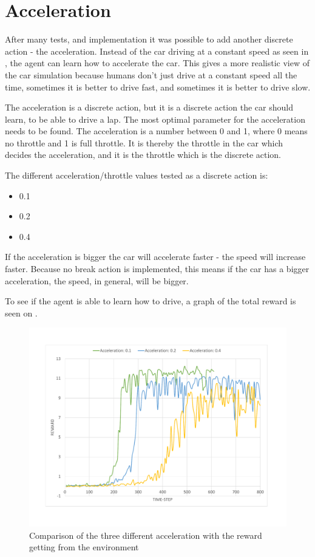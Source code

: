 \section{Acceleration}\label{sectionAcceleration_new}
After many tests, and implementation it was possible to add another discrete action - the acceleration. Instead of the car driving at a constant speed as seen in , the agent can learn how to accelerate the car. This gives a more realistic view of the car simulation because humans don't just drive at a constant speed all the time, sometimes it is better to drive fast, and sometimes it is better to drive slow.  

The acceleration is a discrete action, but it is a discrete action the car should learn, to be able to drive a lap. The most optimal parameter for the acceleration needs to be found. The acceleration is a number between 0 and 1, where 0 means no throttle and 1 is full throttle. It is thereby the throttle in the car which decides the acceleration, and it is the throttle which is the discrete action.

The different acceleration/throttle values tested as a discrete action is:

\begin{itemize}
	\item 0.1
	\item 0.2
	\item 0.4
\end{itemize} 
   
If the acceleration is bigger the car will accelerate faster - the speed will increase faster. Because no break action is implemented, this means if the car has a bigger acceleration, the speed, in general, will be bigger. 

To see if the agent is able to learn how to drive, a graph of the total reward is seen on .

\begin{figure}[H]
	\centering
	\includegraphics[width=1\textwidth]{Figures/Result/change_of_acceleration_new_reward_graph.pdf}
	\caption{Comparison of the three different acceleration with the reward getting from the environment}
	\label{fig:change_of_acceleration_new_reward_graph}
\end{figure} 


